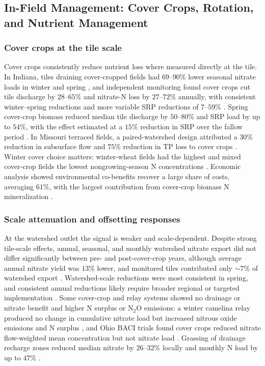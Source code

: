 \documentclass[11pt]{article}
\begin{document}
\subsection{In-Field Management: Cover Crops, Rotation, and Nutrient Management}

\subsubsection{Cover crops at the tile scale}

Cover crops consistently reduce nutrient loss where measured directly at
the tile. In Indiana, tiles draining cover-cropped fields had
$69$--$90\%$ lower seasonal nitrate loads in winter and spring
\parencite{Hanrahan2018}, and independent monitoring found cover crops cut
tile discharge by $28$--$65\%$ and nitrate-N loss by $27$--$72\%$ annually,
with consistent winter--spring reductions and more variable SRP reductions
of $7$--$59\%$ \parencite{Speir2022}. Spring cover-crop biomass reduced
median tile discharge by $50$--$80\%$ and SRP load by up to $54\%$, with
the effect estimated at a $15\%$ reduction in SRP over the fallow period
\parencite{Trentman2020}. In Missouri terraced fields, a paired-watershed
design attributed a $30\%$ reduction in subsurface flow and $75\%$
reduction in TP loss to cover crops \parencite{SalcedaGonzalez2025}. Winter
cover choice matters: winter-wheat fields had the highest and mixed
cover-crop fields the lowest nongrowing-season N concentrations
\parencite{McNeill2026}. Economic analysis showed environmental
co-benefits recover a large share of costs, averaging $61\%$, with the
largest contribution from cover-crop biomass N mineralization
\parencite{Roth2018}.

\subsubsection{Scale attenuation and offsetting responses}

At the watershed outlet the signal is weaker and scale-dependent. Despite
strong tile-scale effects, annual, seasonal, and monthly watershed nitrate
export did not differ significantly between pre- and post-cover-crop years,
although average annual nitrate yield was $13\%$ lower, and monitored tiles
contributed only $\sim7\%$ of watershed export \parencite{Hanrahan2018}.
Watershed-scale reductions were most consistent in spring, and consistent
annual reductions likely require broader regional or targeted
implementation \parencite{Speir2022}. Some cover-crop and relay systems
showed no drainage or nitrate benefit and higher N surplus or N$_2$O
emissions: a winter camelina relay produced no change in cumulative
nitrate load but increased nitrous oxide emissions and N surplus
\parencite{Emmett2022}, and Ohio BACI trials found cover crops reduced
nitrate flow-weighted mean concentration but not nitrate load
\parencite{Askar2023}. Grassing of drainage recharge zones reduced median
nitrate by $26$--$32\%$ locally and monthly N load by up to $47\%$
\parencite{Fucík2015,Kvítek2023}.
\end{document}
